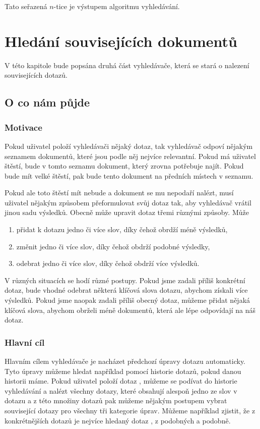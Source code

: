 \documentclass[12pt]{article}
\newcommand{\ssection}[1]{\subsection{#1}}
\newcommand{\sssection}[1]{\subsubsection{#1}}
\begin{document}
Tato seřazená $n$-tice je výstupem algoritmu vyhledávání. 


\newpage
\section{Hledání souvisejících dokumentů}
V této kapitole bude popsána druhá část vyhledávače, která se stará o nalezení souvisejících dotazů. 

\ssection{O co nám půjde}

\sssection{Motivace}

Pokud uživatel položí vyhledávači nějaký dotaz, tak vyhledávač odpoví nějakým seznamem dokumentů, které jsou podle něj nejvíce relevantní. Pokud má uživatel štěstí, bude v tomto seznamu dokument, který zrovna potřebuje najít. Pokud bude mít velké štěstí, pak bude tento dokument na předních místech v seznamu. 

Pokud ale toto štěstí mít nebude a dokument se mu nepodaří nalézt, musí uživatel nějakým způsobem přeformulovat svůj dotaz tak, aby vyhledávač vrátil jinou sadu výsledků. Obecně může upravit dotaz třemi různými způsoby. Může

\begin{enumerate}
\item přidat k dotazu jedno či více slov, díky čehož obrdží méně výsledků,
\item změnit jedno či více slov, díky čehož obdrží podobné výsledky,
\item odebrat jedno či více slov, díky čehož obdrží více výsledků.
\end{enumerate}

V různých situacích se hodí různé postupy. Pokud jsme zadali příliš konkrétní dotaz, bude vhodné odebrat některá klíčová slova dotazu, abychom získali více výsledků. Pokud jsme naopak zadali příliš obecný dotaz, můžeme přidat nějaká klíčová slova, abychom obrželi méně dokumentů, která ale lépe odpovídají na náš dotaz. 

\sssection{Hlavní cíl}

Hlavním cílem vyhledávače je nacházet předchozí úpravy dotazu automaticky. Tyto úpravy můžeme hledat například pomocí historie dotazů, pokud danou historii máme. Pokud uživatel položí dotaz , můžeme se podívat do historie vyhledávání a nalézt všechny dotazy, které obsahují alespoň jedno ze slov v dotazu a z této množiny dotazů pak můžeme nějakým postupem vybrat související dotazy pro všechny tři kategorie úprav. Můžeme například zjistit, že z konkrétnějších dotazů je nejvíce hledaný dotaz , z podobných  a podobně. 
\end{document}
